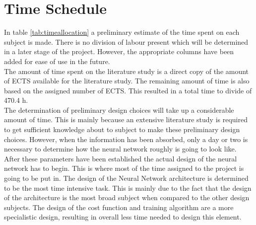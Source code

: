 \section{Time Schedule}
\label{TimeTable}

In table \ref{tab:timeallocation} a preliminary estimate of the time spent on each subject is made. There is no division of labour present which will be determined in a later stage of the project. However, the appropriate columns have been added for ease of use in the future. \\

The amount of time spent on the literature study is a direct copy of the amount of ECTS available for the literature study. The remaining amount of time is also based on the assigned number of ECTS. This resulted in a total time to divide of 470.4 h.\\

The determination of preliminary design choices will take up a considerable amount of time. This is mainly because an extensive literature study is required to get sufficient knowledge about to subject to make these preliminary design choices. However, when the information has been absorbed, only a day or two is necessary to determine how the neural network roughly is going to look like. \\

After these parameters have been established the actual design of the neural network has to begin. This is where most of the time assigned to the project is going to be put in. The design of the Neural Network architecture is determined to be the most time intensive task. 
This is mainly due to the fact that the design of the architecture is the most broad subject when compared to the other design subjects. The design of the cost function and training algorithm are a more specialistic design, resulting in overall less time needed to design this element.





